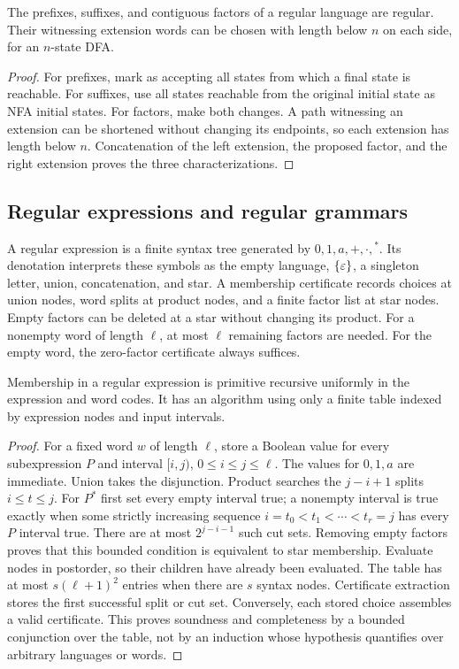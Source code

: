\begin{corollary}\label{reg:factors}
The prefixes, suffixes, and contiguous factors of a regular language are
regular.  Their witnessing extension words can be chosen with length
below $n$ on each side, for an $n$-state DFA.
\end{corollary}
\begin{proof}
For prefixes, mark as accepting all states from which a final state is
reachable.  For suffixes, use all states reachable from the original
initial state as NFA initial states.  For factors, make both changes.
A path witnessing an extension can be shortened without changing its
endpoints, so each extension has length below $n$.  Concatenation of the
left extension, the proposed factor, and the right extension proves the
three characterizations.
\end{proof}

\subsection{Regular expressions and regular grammars}

A regular expression is a finite syntax tree generated by
$0,1,a,+,\cdot,{}^*$.  Its denotation interprets these symbols as the empty
language, $\{\varepsilon\}$, a singleton letter, union, concatenation, and star.
A membership certificate records choices at union nodes, word splits at
product nodes, and a finite factor list at star nodes.  Empty factors can
be deleted at a star without changing its product.  For a nonempty word
of length $\ell$, at most $\ell$ remaining factors are needed.  For the
empty word, the zero-factor certificate always suffices.

\begin{proposition}\label{reg:regexdec}
Membership in a regular expression is primitive recursive uniformly in
the expression and word codes.  It has an algorithm using only a finite
table indexed by expression nodes and input intervals.
\end{proposition}
\begin{proof}
For a fixed word $w$ of length $\ell$, store a Boolean value for every
subexpression $P$ and interval $[i,j)$, $0\leq i\leq j\leq\ell$.
The values for $0,1,a$ are immediate.  Union takes the disjunction.
Product searches the $j-i+1$ splits $i\leq t\leq j$.  For $P^*$ first
set every empty interval true; a nonempty interval is true exactly when
some strictly increasing sequence
$i=t_0<t_1<\cdots<t_r=j$ has every $P$ interval true.  There are at most
$2^{j-i-1}$ such cut sets.  Removing empty factors proves that this
bounded condition is equivalent to star membership.  Evaluate nodes in
postorder, so their children have already been evaluated.  The table has
at most $s(\ell+1)^2$ entries when there are $s$ syntax nodes.  Certificate
extraction stores the first successful split or cut set.  Conversely,
each stored choice assembles a valid certificate.  This proves soundness
and completeness by a bounded conjunction over the table, not by an
induction whose hypothesis quantifies over arbitrary languages or words.
\end{proof}

